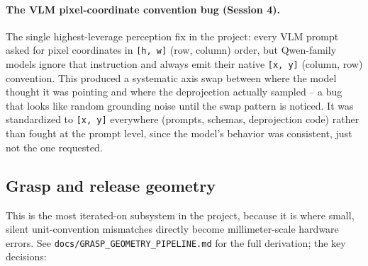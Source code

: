 \paragraph{The VLM pixel-coordinate convention bug (Session 4).} The single
highest-leverage perception fix in the project: every VLM prompt asked for
pixel coordinates in \texttt{[h, w]} (row, column) order, but Qwen-family
models ignore that instruction and always emit their native \texttt{[x, y]}
(column, row) convention. This produced a systematic axis swap between where
the model thought it was pointing and where the deprojection actually
sampled -- a bug that looks like random grounding noise until the swap
pattern is noticed. It was standardized to \texttt{[x, y]} everywhere
(prompts, schemas, deprojection code) rather than fought at the prompt level,
since the model's behavior was consistent, just not the one requested.

\subsection{Grasp and release geometry}

This is the most iterated-on subsystem in the project, because it is where
small, silent unit-convention mismatches directly become millimeter-scale
hardware errors. See \texttt{docs/GRASP\_GEOMETRY\_PIPELINE.md} for the full
derivation; the key decisions:

